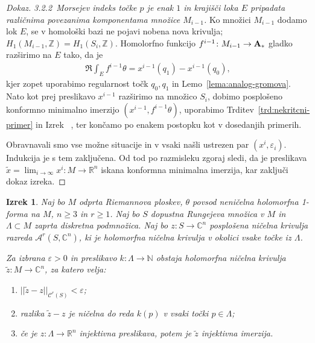 \documentclass[12pt,a4paper,twoside]{article}
\theoremstyle{definition} %
\newenvironment{dokaz}[1][Dokaz]{\begin{proof}[#1]}{\end{proof}}
\theoremstyle{plain} %
\newtheorem{izrek}[definicija]{Izrek}
\numberwithin{equation}{section}  %
\newcommand{\R}{\mathbb R}
\newcommand{\N}{\mathbb N}
\newcommand{\C}{\mathbb C}
\begin{document}
\begin{dokaz}
\textit{3.2.2~Morsejev indeks točke $p$ je enak $1$ in krajišči loka $E$ pripadata različnima povezanima komponentama množice $M_{i-1}$.} \newline
Ko množici $M_{i-1}$ dodamo lok $E$, se v homološki bazi ne pojavi nobena nova krivulja; $H_{1}(M_{i-1}, \mathbb{Z}) = H_{1}(S_{i}, \mathbb{Z})$.
Homolorfno funkcijo $f^{i-1} \colon M_{i-1} \to \textup{\textbf{A}}_{*}$ gladko razširimo na $E$ tako, da je
\begin{gather*}
\Re \int_{E} f^{i-1} \theta = x^{i-1}(q_1) - x^{i-1}(q_0),
\end{gather*}
kjer zopet uporabimo regularnost točk $q_0, q_1$ in Lemo~\ref{lema:analog-gromova}.
Nato kot prej preslikavo $x^{i-1}$ razširimo na množico $S_{i}$, dobimo posplošeno konformno minimalno imerzijo $(x^{i-1}, f^{i-1} \theta)$, uporabimo Trditev~\ref{trd:nekritcni-primer} in Izrek ~\cite[Theorem~3.4.1]{alarcon2021minimal},
ter končamo po enakem postopku kot v dosedanjih primerih. \newline

Obravnavali smo vse možne situacije in v vsaki našli ustrezen par $(x^{i}, \varepsilon_{i})$. Indukcija je s tem zaključena. Od tod po razmisleku zgoraj sledi, da je preslikava $\tilde{x} = \lim_{i \to \infty} x^{i} \colon M \to \mathbb{R}^{n}$ iskana konformna minimalna imerzija, kar zaključi dokaz izreka.
\end{dokaz}

\begin{izrek} \label{izr:glavni-izrek-NC}
Naj bo $M$ odprta Riemannova ploskev, $\theta$ povsod neničelna holomorfna 1-forma na $M$, $n \geq 3$ in $r \geq 1$.
Naj bo $S$ dopustna Rungejeva množica v $M$ in $\Lambda \subset M$ zaprta diskretna podmnožica. 
Naj bo $z \colon S \to \C^{n}$ posplošena ničelna krivulja razreda $\mathcal{A}^{r}(S, \C^{n})$, ki je holomorfna ničelna krivulja v okolici vsake točke iz $\Lambda$.

Za izbrana $\varepsilon > 0$ in preslikavo $k \colon \Lambda \to \N$ obstaja holomorfna ničelna krivulja $\tilde{z} \colon M \to \C^{n}$, za katero velja:
\begin{enumerate}
\item $||\tilde{z} - z||_{\mathcal{C}^{r}(S)} < \varepsilon$;
\item razlika $\tilde{z}-z$ je ničelna do reda $k(p)$ v vsaki točki $p\in \Lambda$;
\item če je $z \colon \Lambda \to \R^{n}$ injektivna preslikava, potem je $\tilde{z}$ injektivna imerzija.
\end{enumerate}
\end{izrek}
\end{document}
